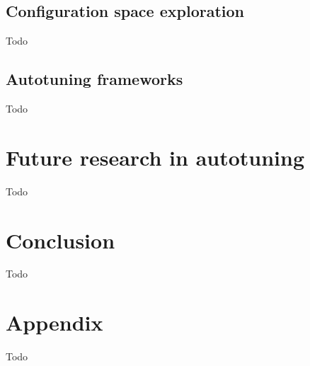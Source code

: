 \documentclass[
  digital,     %
  oneside,     %
  nosansbold,  %
  nocolorbold, %
  lof,         %
  lot,         %
  nocover
]{fithesis4}
\begin{document}
\section{Configuration space exploration}
Todo

\section{Autotuning frameworks}
Todo

\chapter{Future research in autotuning}
Todo

\chapter{Conclusion}
Todo

\nocite{*}
\printbibliography[heading=bibintoc]

\appendix
\chapter{Appendix}
Todo
\end{document}
